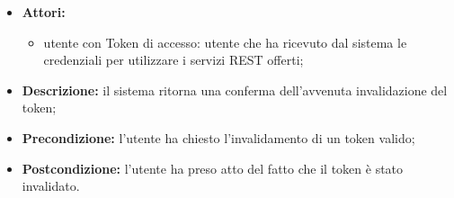 \begin{itemize}
	\item \textbf{Attori:}
	\begin{itemize}
		\item utente con Token di accesso: utente che ha ricevuto dal sistema le credenziali per utilizzare i servizi REST offerti;
	\end{itemize}
	\item \textbf{Descrizione:} il sistema ritorna una conferma dell'avvenuta invalidazione del token;
	\item \textbf{Precondizione:} l'utente ha chiesto l'invalidamento di un token valido;
	\item \textbf{Postcondizione:} l'utente ha preso atto del fatto che il token è stato invalidato.
\end{itemize}


\pagebreak
